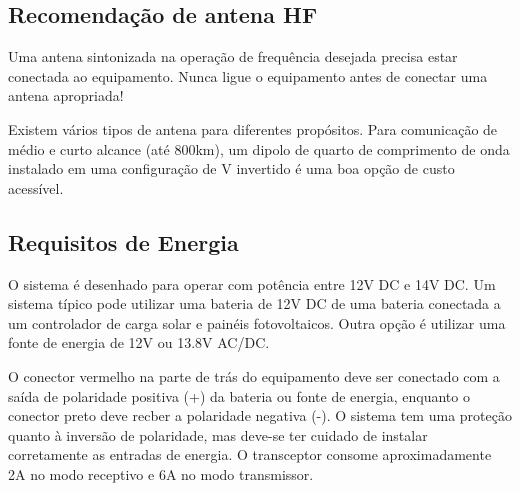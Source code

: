 \documentclass[11pt,a4paper]{article}
\begin{document}
\subsection{Recomendação de antena HF}

Uma antena sintonizada na operação de frequência desejada precisa estar conectada ao equipamento. Nunca ligue o equipamento antes de conectar uma antena apropriada! 


Existem vários tipos de antena para diferentes propósitos. Para comunicação de médio e curto alcance (até 800km), um dipolo de quarto de comprimento de onda instalado em uma configuração de V invertido é uma boa opção de custo acessível.


\subsection{Requisitos de Energia}

O sistema é desenhado para operar com potência entre 12V DC e 14V DC. Um sistema típico pode utilizar uma bateria de 12V DC de uma bateria conectada a um controlador de carga solar e painéis fotovoltaicos. Outra opção é utilizar uma fonte de energia de 12V ou 13.8V AC/DC. 


O conector vermelho na parte de trás do equipamento deve ser conectado com a saída de polaridade positiva (+) da bateria ou fonte de energia, enquanto o conector preto deve recber a polaridade negativa (-). O sistema tem uma proteção quanto à inversão de polaridade, mas deve-se ter cuidado de instalar corretamente as entradas de energia. O transceptor consome aproximadamente 2A no modo receptivo e 6A no modo transmissor.

\end{document}
